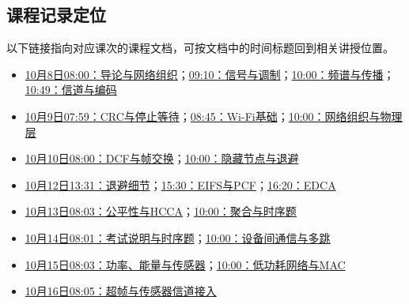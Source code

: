 \subsection*{课程记录定位}
以下链接指向对应课次的课程文档，可按文档中的时间标题回到相关讲授位置。
\begin{itemize}
\item \href{https://lcn6dqn3m0yr.feishu.cn/docx/SJM4dzPKHo4upfxK4yjcLTz9nBj}{10月8日08:00：导论与网络组织}；\href{https://lcn6dqn3m0yr.feishu.cn/docx/R8JJdjfT2oKLnVxpZTTcSJO6nth}{09:10：信号与调制}；\href{https://lcn6dqn3m0yr.feishu.cn/docx/BaBFdm7AzoHPSYxulLwcWRgenBf}{10:00：频谱与传播}；\href{https://lcn6dqn3m0yr.feishu.cn/docx/ENxEdQVrvoRZ6lxgUeAcu5yBnng}{10:49：信道与编码}
\item \href{https://lcn6dqn3m0yr.feishu.cn/docx/GSiDdfhZHoJ99Ux1XducLUkgn6b}{10月9日07:59：CRC与停止等待}；\href{https://lcn6dqn3m0yr.feishu.cn/docx/PnXMd5tSLoFiWDxmYvDcS6BJnfe}{08:45：Wi-Fi基础}；\href{https://lcn6dqn3m0yr.feishu.cn/docx/JT5ydOxALoxXVSxQTN0cM40enid}{10:00：网络组织与物理层}
\item \href{https://lcn6dqn3m0yr.feishu.cn/docx/FfgDdqktToKXpyxwlCxcv7GanSb}{10月10日08:00：DCF与帧交换}；\href{https://lcn6dqn3m0yr.feishu.cn/docx/LN0Xdi9daou8cFxTeT8cSCsbnnh}{10:00：隐藏节点与退避}
\item \href{https://lcn6dqn3m0yr.feishu.cn/docx/BSkQdCu5LoOPopxZWPGcbeJhnhf}{10月12日13:31：退避细节}；\href{https://lcn6dqn3m0yr.feishu.cn/docx/EsHBd3OOCo6ODAxhlMKc6JxNn9d}{15:30：EIFS与PCF}；\href{https://lcn6dqn3m0yr.feishu.cn/docx/BEhKd4SRwo8qxexUkBjcSpTMnfE}{16:20：EDCA}
\item \href{https://lcn6dqn3m0yr.feishu.cn/docx/QX16d9bfUoakAHxlKBCcnf2qnPg}{10月13日08:03：公平性与HCCA}；\href{https://lcn6dqn3m0yr.feishu.cn/docx/KZRBdsn5hoo9eDxMz1ucm6h0ned}{10:00：聚合与时序题}
\item \href{https://lcn6dqn3m0yr.feishu.cn/docx/Z6bvdAi7wo7stVxgwETcOt25nDf}{10月14日08:01：考试说明与时序题}；\href{https://lcn6dqn3m0yr.feishu.cn/docx/TqofdOKfFoCaoixV2cfccaBEnMh}{10:00：设备间通信与多跳}
\item \href{https://lcn6dqn3m0yr.feishu.cn/docx/SVZTdsr4ZoJsP3xd8GLcV7JjnAh}{10月15日08:03：功率、能量与传感器}；\href{https://lcn6dqn3m0yr.feishu.cn/docx/Onm4dp9S1oLG5hxAtzVcrCXknGf}{10:00：低功耗网络与MAC}
\item \href{https://lcn6dqn3m0yr.feishu.cn/docx/H8UxdBbx7owjVmxCeMbcnihengg}{10月16日08:05：超帧与传感器信道接入}
\end{itemize}
